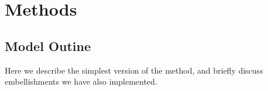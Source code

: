 \documentclass[11pt]{article}
\def\lfdr{\textit{lfdr}}
\def\bhat{\hat{\beta}}
\def\ashr{{\tt ashr}\xspace}
\begin{document}

\def\df{df}
\def\FDR{\text{FDR}}
\def\fdr{\text{\lfdr}}
\def\FSR{\text{FSR}}
\def\fsr{\text{lfsr}}

 \section*{Methods}

 \subsection*{Model Outine}
 
Here we describe the simplest version of the method, and briefly discuss embellishments we have also implemented.
\end{document}
